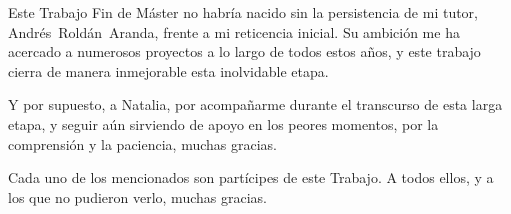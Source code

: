 Este Trabajo Fin de Máster no habría nacido sin la persistencia de mi tutor, Andrés~Roldán~Aranda, frente a mi reticencia inicial. Su ambición me ha acercado a numerosos proyectos a lo largo de todos estos años, y este trabajo cierra de manera inmejorable esta inolvidable etapa.

Y por supuesto, a Natalia, por acompañarme durante el transcurso de esta larga etapa, y seguir aún sirviendo de apoyo en los peores momentos, por la comprensión y la paciencia, muchas gracias.


Cada uno de los mencionados son partícipes de este Trabajo. A todos ellos, y a los que no pudieron verlo, muchas gracias.

\afterpage{\blankpage}

%
%
%
%

